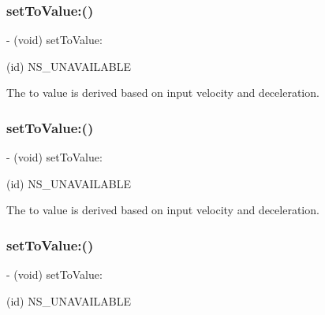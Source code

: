 \subsubsection{\texorpdfstring{set\+To\+Value\+:()}{setToValue:()}\hspace{0.1cm}{\footnotesize\ttfamily [1/3]}}
{\footnotesize\ttfamily -\/ (void) set\+To\+Value\+: \begin{DoxyParamCaption}\item[{(id)}]{N\+S\+\_\+\+U\+N\+A\+V\+A\+I\+L\+A\+B\+LE }\end{DoxyParamCaption}}

The to value is derived based on input velocity and deceleration. \mbox{\label{interface_p_o_p_decay_animation_a1bf62f2b436ed5e5846f3a6b1bc0987b}} 
\subsubsection{\texorpdfstring{set\+To\+Value\+:()}{setToValue:()}\hspace{0.1cm}{\footnotesize\ttfamily [2/3]}}
{\footnotesize\ttfamily -\/ (void) set\+To\+Value\+: \begin{DoxyParamCaption}\item[{(id)}]{N\+S\+\_\+\+U\+N\+A\+V\+A\+I\+L\+A\+B\+LE }\end{DoxyParamCaption}}

The to value is derived based on input velocity and deceleration. \mbox{\label{interface_p_o_p_decay_animation_a1bf62f2b436ed5e5846f3a6b1bc0987b}} 
\subsubsection{\texorpdfstring{set\+To\+Value\+:()}{setToValue:()}\hspace{0.1cm}{\footnotesize\ttfamily [3/3]}}
{\footnotesize\ttfamily -\/ (void) set\+To\+Value\+: \begin{DoxyParamCaption}\item[{(id)}]{N\+S\+\_\+\+U\+N\+A\+V\+A\+I\+L\+A\+B\+LE }\end{DoxyParamCaption}}

